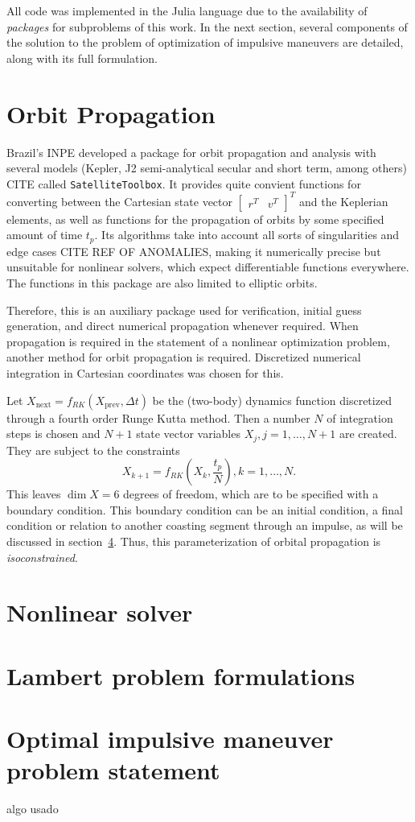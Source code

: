 
All code was implemented in the Julia language due to the availability of \textit{packages} for subproblems of this work. In the next section, several components of the solution to the problem of optimization of impulsive maneuvers are detailed, along with its full formulation.

\section{Orbit Propagation}

Brazil's INPE developed a package for orbit propagation and analysis with several models (Kepler, J2 semi-analytical secular and short term, among others) CITE called \texttt{SatelliteToolbox}. It provides quite convient functions for converting between the Cartesian state vector \(\begin{bmatrix}
    r^T & v^T
\end{bmatrix}^T\) and the Keplerian elements, as well as functions for the propagation of orbits by some specified amount of time \(t_p\). Its algorithms take into account all sorts of singularities and edge cases CITE REF OF ANOMALIES, making it numerically precise but unsuitable for nonlinear solvers, which expect differentiable functions everywhere. The functions in this package are also limited to elliptic orbits.

Therefore, this is an auxiliary package used for verification, initial guess generation, and direct numerical propagation whenever required. When propagation is required in the statement of a nonlinear optimization problem, another method for orbit propagation is required. Discretized numerical integration in Cartesian coordinates was chosen for this. 

Let \(X_{\text{next}} = f_{RK}(X_{\text{prev}}, \Delta t)\) be the (two-body) dynamics function discretized through a fourth order Runge Kutta method. Then a number \(N\) of integration steps is chosen and \(N+1\) state vector variables \(X_j, j=1,\dots,N+1\) are created. They are subject to the constraints
\begin{equation}
    X_{k+1} = f_{RK}(X_k, \frac{t_p}{N}), k = 1, \dots, N.
\end{equation}
This leaves \(\dim X = 6\) degrees of freedom, which are to be specified with a boundary condition. This boundary condition can be an initial condition, a final condition or relation to another coasting segment through an impulse, as will be discussed in section~\ref{sec:impulsive_statement}. Thus, this parameterization of orbital propagation is \textit{isoconstrained}.

\section{Nonlinear solver}



\section{Lambert problem formulations}

\section{Optimal impulsive maneuver problem statement} \label{sec:impulsive_statement}

algo usado